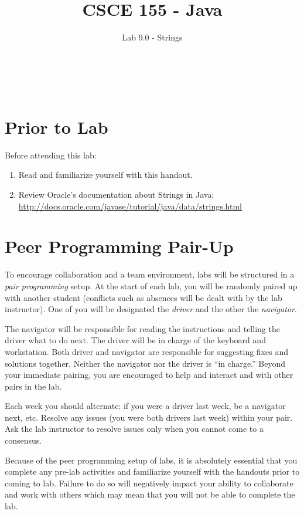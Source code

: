 \documentclass[12pt]{scrartcl}
\title{CSCE 155 - Java}
\subtitle{Lab 9.0 - Strings}
\author{~}
\date{~}
\begin{document}
\maketitle

\section*{Prior to Lab}

Before attending this lab:
\begin{enumerate}
  \item Read and familiarize yourself with this handout.
  \item Review Oracle's documentation about Strings in Java: 
  	\url{http://docs.oracle.com/javase/tutorial/java/data/strings.html}
\end{enumerate}

\section*{Peer Programming Pair-Up}

To encourage collaboration and a team environment, labs will be
structured in a \emph{pair programming} setup.  At the start of
each lab, you will be randomly paired up with another student 
(conflicts such as absences will be dealt with by the lab instructor).
One of you will be designated the \emph{driver} and the other
the \emph{navigator}.  

The navigator will be responsible for reading the instructions and
telling the driver what to do next.  The driver will be in charge of the
keyboard and workstation.  Both driver and navigator are responsible
for suggesting fixes and solutions together.  Neither the navigator
nor the driver is ``in charge.''  Beyond your immediate pairing, you
are encouraged to help and interact and with other pairs in the lab.

Each week you should alternate: if you were a driver last week, 
be a navigator next, etc.  Resolve any issues (you were both drivers
last week) within your pair.  Ask the lab instructor to resolve issues
only when you cannot come to a consensus.  

Because of the peer programming setup of labs, it is absolutely 
essential that you complete any pre-lab activities and familiarize
yourself with the handouts prior to coming to lab.  Failure to do
so will negatively impact your ability to collaborate and work with 
others which may mean that you will not be able to complete the
lab.  
\end{document}
